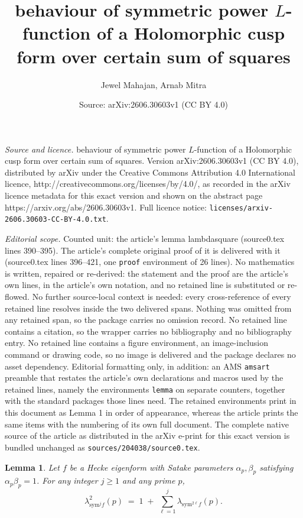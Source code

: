 \documentclass[10pt,a4paper]{amsart}
\title{behaviour of symmetric power $L$-function of a Holomorphic cusp form over certain sum of squares}
\author{Jewel Mahajan, Arnab Mitra}
\date{Source: arXiv:2606.30603v1 (CC BY 4.0)}
\newtheorem{lemma}{Lemma}
\begin{document}
\maketitle

\noindent\emph{Source and licence.} behaviour of symmetric power $L$-function of a Holomorphic cusp form over certain sum of squares. Version arXiv:2606.30603v1 (CC BY 4.0), distributed by arXiv under the Creative Commons Attribution 4.0 International licence, http://creativecommons.org/licenses/by/4.0/, as recorded in the arXiv licence metadata for this exact version and shown on the abstract page https://arxiv.org/abs/2606.30603v1. Full licence notice: \texttt{licenses/arxiv-2606.30603-CC-BY-4.0.txt}.\par\smallskip

\noindent\textit{Editorial scope.} Counted unit: the article's lemma lambdasquare (source0.tex lines 390--395). The article's complete original proof of it is delivered with it (source0.tex lines 396--421, one \texttt{proof} environment of 26 lines). No mathematics is written, repaired or re-derived: the statement and the proof are the article's own lines, in the article's own notation, and no retained line is substituted or re-flowed.  No further source-local context is needed: every cross-reference of every retained line resolves inside the two delivered spans.  Nothing was omitted from any retained span, so the package carries no omission record.  No retained line contains a citation, so the wrapper carries no bibliography and no bibliography entry.  No retained line contains a figure environment, an image-inclusion command or drawing code, so no image is delivered and the package declares no asset dependency.  Editorial formatting only, in addition: an AMS \texttt{amsart} preamble that restates the article's own declarations and macros used by the retained lines, namely the environments \texttt{lemma} on separate counters, together with the standard packages those lines need.  The retained environments print in this document as Lemma 1 in order of appearance, whereas the article prints the same items with the numbering of its own full document.  The complete native source of the article as distributed in the arXiv e-print for this exact version is bundled unchanged as \texttt{sources/204038/source0.tex}.
\begin{lemma}\label{lambdasquare}
Let $f$ be a Hecke eigenform with Satake parameters $\alpha_p,\beta_p$ satisfying $\alpha_p\beta_p=1$.
For any integer $j \ge 1$ and any prime $p$,
\[
\lambda_{\mathrm{sym}^{j}f}^{2}(p) \;=\; 1 \;+\; \sum_{\ell=1}^{j} \lambda_{\mathrm{sym}^{2\ell}f}(p).\]
\end{lemma}
\end{document}
